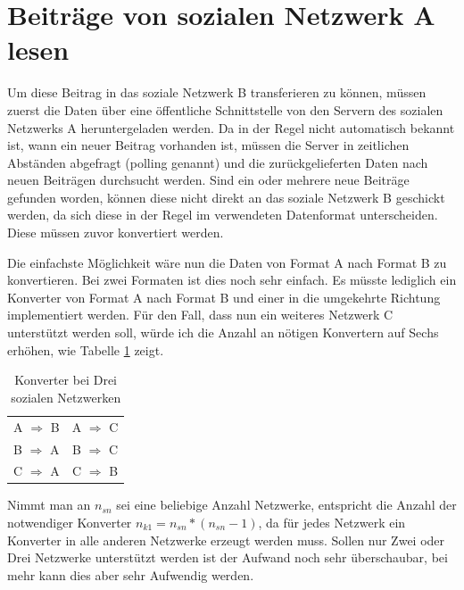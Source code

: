 \section{Beiträge von sozialen Netzwerk A lesen} %
\label{sec:beiträge_von_solzialen_netzwerk_a_lesen}


 Um diese Beitrag in das soziale Netzwerk B transferieren zu können, müssen zuerst die Daten über eine öffentliche Schnittstelle von den Servern des sozialen Netzwerks A heruntergeladen werden. Da in der Regel nicht automatisch bekannt ist, wann ein neuer Beitrag vorhanden ist, müssen die Server in zeitlichen Abständen abgefragt (polling genannt) und die zurückgelieferten Daten nach neuen Beiträgen durchsucht werden. Sind ein oder mehrere neue Beiträge gefunden worden, können diese nicht direkt an das soziale Netzwerk B geschickt werden, da sich diese in der Regel im verwendeten Datenformat unterscheiden. Diese müssen zuvor konvertiert werden.

\medskip

 Die einfachste Möglichkeit wäre nun die Daten von Format A nach Format B zu konvertieren. Bei zwei Formaten ist dies noch sehr einfach. Es müsste lediglich ein Konverter von Format A nach Format B und einer in die umgekehrte Richtung implementiert werden. Für den Fall, dass nun ein weiteres Netzwerk C unterstützt werden soll, würde ich die Anzahl an nötigen Konvertern auf Sechs erhöhen, wie Tabelle \ref{tbl:anzahl_konvertern_bei_drei_netzwerken} zeigt. 

 \medskip

\begin{table}[h]
    \centering
    \begin{tabular}{cc}
        A $ \Rightarrow $ B & A $ \Rightarrow $ C \\
        B $ \Rightarrow $ A & B $ \Rightarrow $ C \\
        C $ \Rightarrow $ A & C $ \Rightarrow $ B \\
    \end{tabular}
    \caption{Konverter bei Drei sozialen Netzwerken}
    \label{tbl:anzahl_konvertern_bei_drei_netzwerken}
\end{table}

 Nimmt man an $n_{sn}$ sei eine beliebige Anzahl Netzwerke, entspricht die Anzahl der notwendiger Konverter $ n_{k1}= n_{sn}*(n_{sn}-1) $, da für jedes Netzwerk ein Konverter in alle anderen Netzwerke erzeugt werden muss. Sollen nur Zwei oder Drei Netzwerke unterstützt werden ist der Aufwand noch sehr überschaubar, bei mehr kann dies aber sehr Aufwendig werden. 

